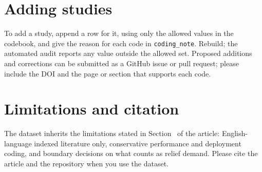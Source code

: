 \documentclass[11pt,a4paper]{article}
\begin{document}
\section{Adding studies}
To add a study, append a row for it, using only the allowed values in the codebook, and give the reason for each code in \texttt{coding\_note}. Rebuild; the automated audit reports any value outside the allowed set. Proposed additions and corrections can be submitted as a GitHub issue or pull request; please include the DOI and the page or section that supports each code.

\section{Limitations and citation}
The dataset inherits the limitations stated in Section~\Xseclimitations{} of the article: English-language indexed literature only, conservative performance and deployment coding, and boundary decisions on what counts as relief demand. Please cite the article and the repository when you use the dataset.
\end{document}
